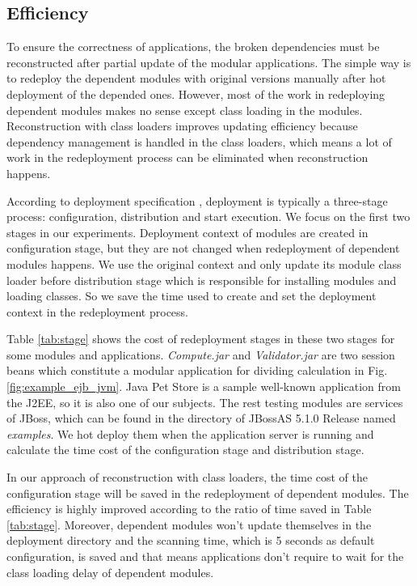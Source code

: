 \documentclass[conference]{IEEEtran}
\begin{document}
\subsection{Efficiency}


To ensure the correctness of applications, the broken dependencies must be reconstructed after partial update of the modular applications.
The simple way is to redeploy the dependent modules with original versions manually after hot deployment of the depended ones.
However, most of the work in redeploying dependent modules makes no sense except class loading in the modules.
Reconstruction with class loaders improves updating efficiency because dependency management is handled in the class loaders, which means a lot of work in the redeployment process can be eliminated when reconstruction happens.

According to deployment specification \cite{jsr88}, deployment is typically a three-stage process: configuration, distribution and start execution.
We focus on the first two stages in our experiments.
Deployment context of modules are created in configuration stage, but they are not changed when redeployment of dependent modules happens.
We use the original context and only update its module class loader before distribution stage which is responsible for installing modules and loading classes.
So we save the time used to create and set the deployment context in the redeployment process.

Table \ref{tab:stage} shows the cost of redeployment stages in these two stages for some modules and applications.
\emph{Compute.jar} and \emph{Validator.jar} are two session beans which constitute a modular application for dividing calculation in Fig. \ref{fig:example_ejb_jvm}.
Java Pet Store \cite{java_pet_store} is a sample well-known application from the J2EE, so it is also one of our subjects.
The rest testing modules are services of JBoss, which can be found in the directory of JBossAS 5.1.0 Release named \emph{examples}.
We hot deploy them when the application server is running and calculate the time cost of the configuration stage and distribution stage.

In our approach of reconstruction with class loaders, the time cost of the configuration stage will be saved in the redeployment of dependent modules.
The efficiency is highly improved according to the ratio of time saved in Table \ref{tab:stage}.
Moreover, dependent modules won't update themselves in the deployment directory and the scanning time, which is 5 seconds as default configuration, is saved and that means applications don't require to wait for the class loading delay of dependent modules. 
\end{document}
